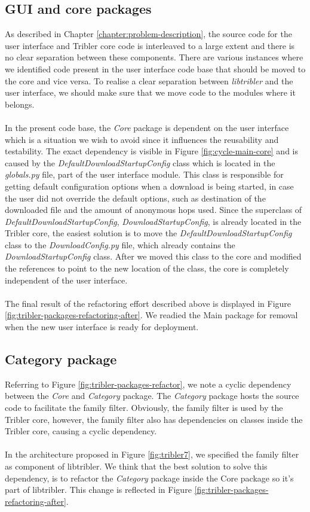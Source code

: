 \subsection{GUI and core packages}
As described in Chapter \ref{chapter:problem-description}, the source code for the user interface and Tribler core code is interleaved to a large extent and there is no clear separation between these components. There are various instances where we identified code present in the user interface code base that should be moved to the core and vice versa. To realise a clear separation between \emph{libtribler} and the user interface, we should make sure that we move code to the modules where it belongs.\\\\
In the present code base, the \emph{Core} package is dependent on the user interface which is a situation we wish to avoid since it influences the reusability and testability. The exact dependency is visible in Figure \ref{fig:cycle-main-core} and is caused by the \emph{DefaultDownloadStartupConfig} class which is located in the \emph{globals.py} file, part of the user interface module. This class is responsible for getting default configuration options when a download is being started, in case the user did not override the default options, such as destination of the downloaded file and the amount of anonymous hops used. Since the superclass of \emph{DefaultDownloadStartupConfig}, \emph{DownloadStartupConfig}, is already located in the Tribler core, the easiest solution is to move the \emph{DefaultDownloadStartupConfig} class to the \emph{DownloadConfig.py} file, which already contains the \emph{DownloadStartupConfig} class. After we moved this class to the core and modified the references to point to the new location of the class, the core is completely independent of the user interface.\\\\
The final result of the refactoring effort described above is displayed in Figure \ref{fig:tribler-packages-refactoring-after}. We readied the Main package for removal when the new user interface is ready for deployment.

\subsection{Category package}
Referring to Figure \ref{fig:tribler-packages-refactor}, we note a cyclic dependency between the \emph{Core} and \emph{Category} package. The \emph{Category} package hosts the source code to facilitate the family filter. Obviously, the family filter is used by the Tribler core, however, the family filter also has dependencies on classes inside the Tribler core, causing a cyclic dependency.\\\\
In the architecture proposed in Figure \ref{fig:tribler7}, we specified the family filter as component of libtribler. We think that the best solution to solve this dependency, is to refactor the \emph{Category} package inside the Core package so it's part of libtribler. This change is reflected in Figure \ref{fig:tribler-packages-refactoring-after}.

